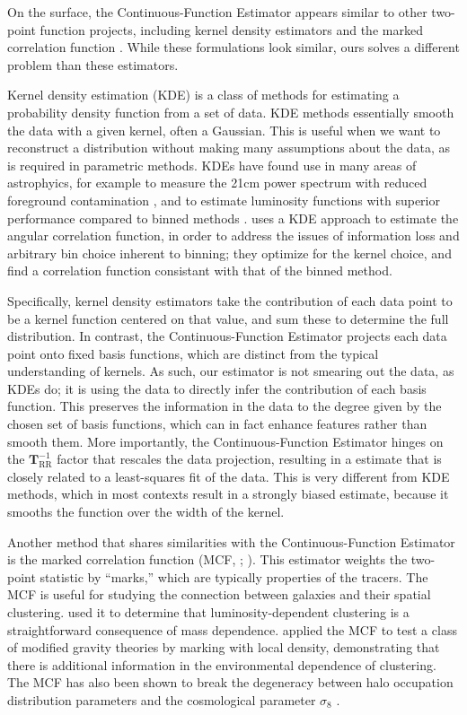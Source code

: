 \documentclass[modern]{aastex62}
\newcommand{\est}{the Continuous-Function Estimator\xspace}
\newcommand{\inv}{^{-1}}
\newcommand{\bld}[1]{\bm{#1}} %
\newcommand{\TT}[1]{\bld{T}_\mathrm{#1}}
\begin{document}
On the surface, \est appears similar to other two-point function projects, including kernel density estimators \citep {Hatfield2016} and the marked correlation function \citep{Beisbart2000}.
While these formulations look similar, ours solves a different problem than these estimators.

Kernel density estimation (KDE) is a class of methods for estimating a probability density function from a set of data.
KDE methods essentially smooth the data with a given kernel, often a Gaussian.
This is useful when we want to reconstruct a distribution without making many assumptions about the data, as is required in parametric methods.
KDEs have found use in many areas of astrophyics, for example to measure the 21cm power spectrum with reduced foreground contamination \citep{Trott2019}, and to estimate luminosity functions with superior performance compared to binned methods \citep{Yuan2020}.
\cite{Hatfield2016} uses a KDE approach to estimate the angular correlation function, in order to address the issues of information loss and arbitrary bin choice inherent to binning; they optimize for the kernel choice, and find a correlation function consistant with that of the binned method.

Specifically, kernel density estimators take the contribution of each data point to be a kernel function centered on that value, and sum these to determine the full distribution.
In contrast, \est projects each data point onto fixed basis functions, which are distinct from the typical understanding of kernels.
As such, our estimator is not smearing out the data, as KDEs do; it is using the data to directly infer the contribution of each basis function.
This preserves the information in the data to the degree given by the chosen set of basis functions, which can in fact enhance features rather than smooth them.
More importantly, \est hinges on the $\TT{RR}\inv$ factor that rescales the data projection, resulting in a estimate that is closely related to a least-squares fit of the data.
This is very different from KDE methods, which in most contexts result in a strongly biased estimate, because it smooths the function over the width of the kernel.

Another method that shares similarities with \est is the marked correlation function (MCF, \citealt{Beisbart2000}; \citealt{Sheth2005}).
This estimator weights the two-point statistic by ``marks,'' which are typically properties of the tracers.
The MCF is useful for studying the connection between galaxies and their spatial clustering.
\cite{Skibba2006} used it to determine that luminosity-dependent clustering is a straightforward consequence of mass dependence.
\cite{Armijo2018} applied the MCF to test a class of modified gravity theories by marking with local density, demonstrating that there is additional information in the environmental dependence of clustering.
The MCF has also been shown to break the degeneracy between halo occupation distribution parameters and the cosmological parameter $\sigma_8$ \citep{WhitePadmanabhan2009}.
\end{document}
